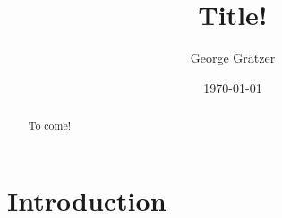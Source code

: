\documentclass{amsart}
\begin{document}
\title{Title!}
\author{George Gr\"{a}tzer}
\address{Department of Mathematics\\
         University of Manitoba\\
         Winnipeg, MB R3T 2N2\\
         Canada} 
\date{\today}

\begin{abstract}
To come!
\end{abstract}

\maketitle

\section{Introduction}\label{S:intro} 

\begin{thebibliography}{9}

\end{thebibliography}
\end{document}
